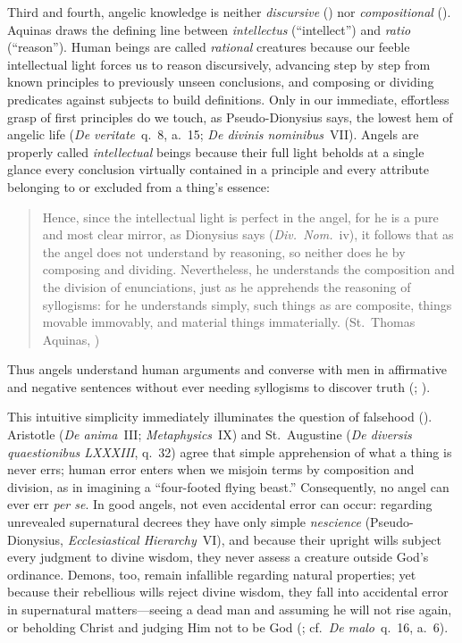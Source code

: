 Third and fourth, angelic knowledge is neither \emph{discursive} () nor \emph{compositional} (). Aquinas draws the defining line between \emph{intellectus} (``intellect'') and \emph{ratio} (``reason''). Human beings are called \emph{rational} creatures because our feeble intellectual light forces us to reason discursively, advancing step by step from known principles to previously unseen conclusions, and composing or dividing predicates against subjects to build definitions. Only in our immediate, effortless grasp of first principles do we touch, as Pseudo-Dionysius says, the lowest hem of angelic life (\emph{De veritate}~q.~8, a.~15; \emph{De divinis nominibus}~VII). Angels are properly called \emph{intellectual} beings because their full light beholds at a single glance every conclusion virtually contained in a principle and every attribute belonging to or excluded from a thing's essence:
\begin{quotation}
Hence, since the intellectual light is perfect in the angel, for he is a pure and most clear mirror, as Dionysius says (\emph{Div.~Nom.}~iv), it follows that as the angel does not understand by reasoning, so neither does he by composing and dividing. Nevertheless, he understands the composition and the division of enunciations, just as he apprehends the reasoning of syllogisms: for he understands simply, such things as are composite, things movable immovably, and material things immaterially. (St.~Thomas Aquinas, )
\end{quotation}
Thus angels understand human arguments and converse with men in affirmative and negative sentences without ever needing syllogisms to discover truth (; ).

This intuitive simplicity immediately illuminates the question of falsehood (). Aristotle (\emph{De anima}~III; \emph{Metaphysics}~IX) and St.~Augustine (\emph{De diversis quaestionibus LXXXIII}, q.~32) agree that simple apprehension of what a thing is never errs; human error enters when we misjoin terms by composition and division, as in imagining a ``four-footed flying beast.'' Consequently, no angel can ever err \emph{per se}. In good angels, not even accidental error can occur: regarding unrevealed supernatural decrees they have only simple \emph{nescience} (Pseudo-Dionysius, \emph{Ecclesiastical Hierarchy}~VI), and because their upright wills subject every judgment to divine wisdom, they never assess a creature outside God's ordinance. Demons, too, remain infallible regarding natural properties; yet because their rebellious wills reject divine wisdom, they fall into accidental error in supernatural matters---seeing a dead man and assuming he will not rise again, or beholding Christ and judging Him not to be God (; cf.~\emph{De malo}~q.~16, a.~6).

